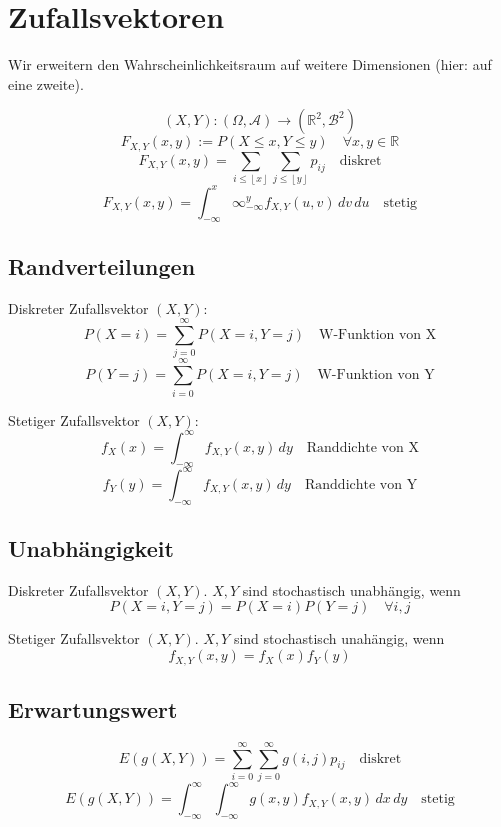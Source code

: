 \documentclass[a4paper,twocolumn]{article}
\newcommand{\floor}[1]{\left\lfloor#1\right\rfloor}
\begin{document}
\section{Zufallsvektoren}

Wir erweitern den Wahrscheinlichkeitsraum auf weitere Dimensionen
(hier: auf eine zweite).

\[
    (X,Y): (\Omega, \mathcal{A}) \longrightarrow (\mathbb{R}^2,\mathcal{B}^2)
\] \[
    F_{X,Y}(x,y) := P(X \leq x, Y \leq y)
        \quad \forall x,y \in \mathbb{R}
\] \[
    F_{X,Y}(x,y) = \sum_{i\leq\floor{x}} \sum_{j\leq\floor{y}} p_{ij}
        \quad \text{diskret}
\] \[
    F_{X,Y}(x,y) = \int_{-\infty}^x \infty_{-\infty}^y f_{X,Y}(u,v)\,dv\,du
        \quad \text{stetig}
\]

\subsection{Randverteilungen}

Diskreter Zufallsvektor $(X,Y)$:
\[
    P(X=i) = \sum_{j=0}^\infty P(X=i, Y=j)
        \quad \text{W-Funktion von X}
\] \[
    P(Y=j) = \sum_{i=0}^\infty P(X=i, Y=j)
        \quad \text{W-Funktion von Y}
\]

Stetiger Zufallsvektor $(X,Y)$:
\[
    f_X(x) = \int_{-\infty}^\infty f_{X,Y}(x,y)\,dy
        \quad \text{Randdichte von X}
\] \[
    f_Y(y) = \int_{-\infty}^\infty f_{X,Y}(x,y)\,dy
        \quad \text{Randdichte von Y}
\]

\subsection{Unabhängigkeit}

Diskreter Zufallsvektor $(X,Y)$. $X,Y$ sind stochastisch unabhängig, wenn
\[
    P(X=i,Y=j) = P(X=i) P(Y=j) \quad\forall i,j
\]

Stetiger Zufallsvektor $(X,Y)$. $X,Y$ sind stochastisch unahängig, wenn
\[
    f_{X,Y}(x,y) = f_X(x) f_Y(y)
\]

\subsection{Erwartungswert}

\[
    E(g(X,Y)) =
        \sum_{i=0}^\infty \sum_{j=0}^\infty g(i,j) p_{ij}
        \quad \text{diskret}
\] \[
    E(g(X,Y)) =
        \int_{-\infty}^\infty \int_{-\infty}^\infty
            g(x,y) f_{X,Y}(x,y)\,dx\,dy
        \quad \text{stetig}
\]
\end{document}
